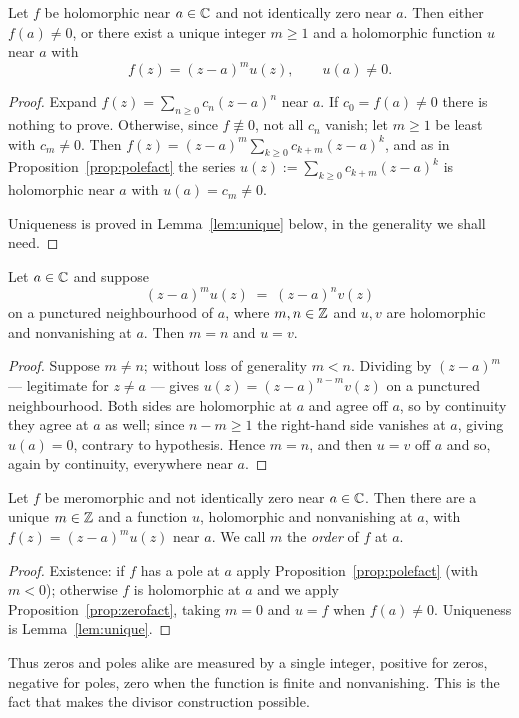 \begin{smjproposition}\label{prop:zerofact}
Let $f$ be holomorphic near $a \in \mathbb{C}$ and not identically zero near $a$. Then
either $f(a) \neq 0$, or there exist a unique integer $m \geq 1$ and a
holomorphic function $u$ near $a$ with
\[
f(z) = (z-a)^m u(z), \qquad u(a) \neq 0 .
\]
\end{smjproposition}

\begin{proof}
Expand $f(z) = \sum_{n \geq 0} c_n (z-a)^n$ near $a$. If $c_0 = f(a) \neq 0$
there is nothing to prove. Otherwise, since $f \not\equiv 0$, not all $c_n$
vanish; let $m \geq 1$ be least with $c_m \neq 0$. Then
$f(z) = (z-a)^m \sum_{k \geq 0} c_{k+m}(z-a)^{k}$, and as in
Proposition~\ref{prop:polefact} the series $u(z) := \sum_{k \geq 0}
c_{k+m}(z-a)^k$ is holomorphic near $a$ with $u(a) = c_m \neq 0$.

Uniqueness is proved in Lemma~\ref{lem:unique} below, in the generality we shall
need.
\end{proof}

\begin{smjlemma}\label{lem:unique}
Let $a \in \mathbb{C}$ and suppose
\[
(z-a)^{m} u(z) \;=\; (z-a)^{n} v(z)
\]
on a punctured neighbourhood of $a$, where $m, n \in \mathbb{Z}$ and $u, v$ are
holomorphic and nonvanishing at $a$. Then $m = n$ and $u = v$.
\end{smjlemma}

\begin{proof}
Suppose $m \neq n$; without loss of generality $m < n$. Dividing by
$(z-a)^{m}$ --- legitimate for $z \neq a$ --- gives $u(z) = (z-a)^{n-m} v(z)$ on
a punctured neighbourhood. Both sides are holomorphic at $a$ and agree off $a$,
so by continuity they agree at $a$ as well; since $n - m \geq 1$ the right-hand
side vanishes at $a$, giving $u(a) = 0$, contrary to hypothesis. Hence $m = n$,
and then $u = v$ off $a$ and so, again by continuity, everywhere near $a$.
\end{proof}

\begin{smjcorollary}\label{cor:localorder}
Let $f$ be meromorphic and not identically zero near $a \in \mathbb{C}$. Then there are
a unique $m \in \mathbb{Z}$ and a function $u$, holomorphic and nonvanishing at $a$,
with $f(z) = (z-a)^m u(z)$ near $a$. We call $m$ the \emph{order} of $f$ at $a$.
\end{smjcorollary}

\begin{proof}
Existence: if $f$ has a pole at $a$ apply Proposition~\ref{prop:polefact} (with
$m < 0$); otherwise $f$ is holomorphic at $a$ and we apply
Proposition~\ref{prop:zerofact}, taking $m = 0$ and $u = f$ when $f(a) \neq 0$.
Uniqueness is Lemma~\ref{lem:unique}.
\end{proof}

Thus zeros and poles alike are measured by a single integer, positive for zeros,
negative for poles, zero when the function is finite and nonvanishing. This is
the fact that makes the divisor construction possible.

